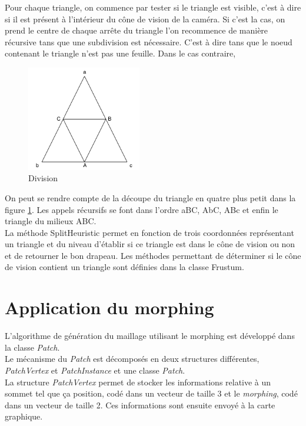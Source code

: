 	Pour chaque triangle, on commence par tester si le triangle est visible, c'est à dire si il est
	présent à l'intérieur du cône de vision de la caméra. Si c'est la cas, on prend le centre de chaque
	arrête du triangle l'on recommence de manière récursive tans que une subdivision est nécessaire.
	C'est à dire tans que le noeud contenant le triangle n'est pas une feuille. Dans le cas contraire,
	
	
    \begin{figure}[!ht]
        \centerline{\includegraphics[width=5cm]{img/TriangleSplit.png}}
        \caption{Division}
        \label{fig:TriangleSplit}
    \end{figure}
	
	On peut se rendre compte de la découpe du triangle en quatre plus petit dans la figure 
	\ref{fig:TriangleSplit}.
	Les appels récursifs se font dans l'ordre aBC, AbC, ABc et enfin le triangle du milieux ABC.\\
	
	La méthode SplitHeuristic permet en fonction de trois coordonnées représentant un triangle 
	et du niveau d'établir si ce triangle est dans le cône de vision ou non et de retourner le bon drapeau.
	Les méthodes permettant de déterminer si le cône de vision contient un triangle sont définies dans
	la classe Frustum.
	
  \section{Application du morphing}
  L'algorithme de génération du maillage utilisant le morphing est développé dans la classe \textit{Patch}.\\ 
  
  Le mécanisme du \textit{Patch} est décomposés en deux structures différentes,
  \textit{PatchVertex} et \textit{PatchInstance} et une classe \textit{Patch}.\\
 
  La structure \textit{PatchVertex} permet de stocker les informations relative à un sommet tel que ça position, codé dans un vecteur de taille 3 et le \textit{morphing}, codé dans un vecteur de taille 2. Ces informations sont ensuite envoyé à la carte graphique.
  
